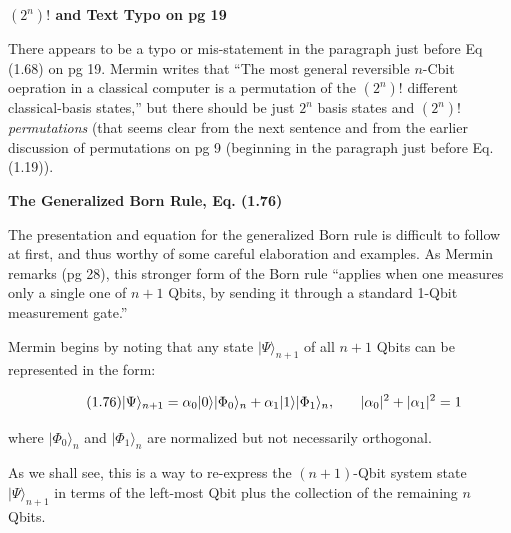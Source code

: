 \documentclass{article}
\begin{document}

\vspace{0.25in}

\textbf{\large $(2^n)!$ and Text Typo on pg 19}\par

\vspace{0.25in}

There appears to be a typo or mis-statement in the paragraph just before Eq (1.68) on pg 19. Mermin writes that ``The most general reversible $n$-Cbit oepration in a classical computer is a permutation of the $(2^n)!$ different classical-basis states,'' but there should be just $2^n$ basis states and $(2^n)!$ \textit{permutations} (that seems clear from the next sentence and from the earlier discussion of permutations on pg 9 (beginning in the paragraph just before Eq. (1.19)).


\vspace{0.25in}

\textbf{\large The Generalized Born Rule, Eq. (1.76)}\par

\vspace{0.25in}

The presentation and equation for the generalized Born rule is difficult to follow at first, and thus worthy  of some careful elaboration and examples. As Mermin remarks (pg 28), this stronger form of the Born rule ``applies when one measures only a single one of $n+1$ Qbits, by sending it through a standard 1-Qbit measurement gate.''

Mermin begins by noting that any state $|\Psi\rangle_{n+1}$ of all $n+1$ Qbits can be represented in the form:

\[\tag{1.76}
|\Psi\rangle_{n+1} =
  \alpha_0 |0\rangle |\Phi_0\rangle_n
  + \alpha_1 |1\rangle |\Phi_1\rangle_n,
  \hspace{0.25in}|\alpha_0|^2 + |\alpha_1|^2 = 1
\]

where $|\Phi_0\rangle_n$ and $|\Phi_1\rangle_n$ are normalized but not necessarily orthogonal.

\vspace{0.125in}

As we shall see, this is a way to re-express the $(n+1)$-Qbit system state $|\Psi\rangle_{n+1}$ in terms of the left-most Qbit plus the collection of the remaining $n$ Qbits.
\end{document}
